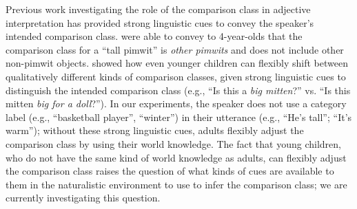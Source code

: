 \documentclass[doc]{apa6}
\begin{document}
Previous work investigating the role of the comparison class in adjective interpretation has provided strong linguistic cues to convey the speaker's intended comparison class. 
 were able to convey to 4-year-olds that the comparison class for a ``tall pimwit'' is \emph{other pimwits} and does not include other non-pimwit objects.
 showed how even younger children can flexibly shift between qualitatively different kinds of comparison classes, given strong linguistic cues to distinguish the intended comparison class (e.g., ``Is this a \emph{big mitten}?'' vs. ``Is this mitten \emph{big for a doll}?'').
In our experiments, the speaker does not use a category label (e.g., ``basketball player'', ``winter'') in their utterance (e.g., ``He's tall''; ``It's warm''); without these strong linguistic cues, adults flexibly adjust the comparison class by using their world knowledge. 
The fact that young children, who do not have the same kind of world knowledge as adults, can flexibly adjust the comparison class raises the question of what kinds of cues are available to them in the naturalistic environment to use to infer the comparison class; we are currently investigating this question.

\end{document}
